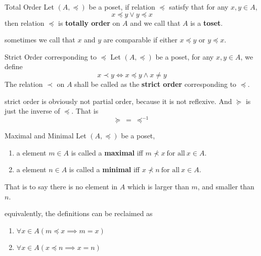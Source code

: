 \begin{definition}{Total Order}{}
  Let $(A,\preceq)$ be a poset, if relation $\preceq$ satisfy that
  for any $x,y \in A$,
  \begin{equation*}
    x \preceq y \lor y \preceq x
  \end{equation*}
  then relation $\preceq$ is \textbf{totally order} on $A$ and we
  call that $A$ is a \textbf{toset}.
\end{definition}

\begin{remarks}
  sometimes we call that $x$ and $y$ are comparable if either $x
  \preceq y$ or $y \preceq x$.
\end{remarks}
\begin{definition}{Strict Order corresponding to $\preceq$}{}
  Let $(A,\preceq)$ be a poset, for any $x,y \in A$, we define
  \begin{equation*}
    x \prec y \iff  x \preceq y \land x \neq y
  \end{equation*}
  The relation $\prec$ on $A$ shall be called as the \textbf{strict
  order} corresponding to $\preceq$.
\end{definition}

\begin{remarks}
  strict order is obviously not partial order, because it is not
  reflexive. And $\succeq$ is just the inverse of $\preceq$. That is
  \begin{equation*}
    \succeq \ = \ \preceq^{-1}
  \end{equation*}
\end{remarks}

\begin{definition}{Maximal and Minimal}{}
  Let $(A,\preceq)$ be a poset,
  \begin{enumerate}

    \item a element $m \in A$ is called a \textbf{maximal} iff $m
      \nprec x \ \text{for all}\ x \in A$.
    \item a element $n \in A$ is called a \textbf{minimal} iff $x
      \nprec n \ \text{for all}\ x \in A$.

  \end{enumerate}

  That is to say there is no element in $A$ which is larger than $m$,
  and smaller than $n$.
\end{definition}

\begin{remarks}
  equivalently, the definitions can be reclaimed as
  \begin{enumerate}

    \item $\forall x \in A (m \preceq x \implies m = x)$
    \item $\forall x \in A (x \preceq n \implies x = n)$

  \end{enumerate}
\end{remarks}

